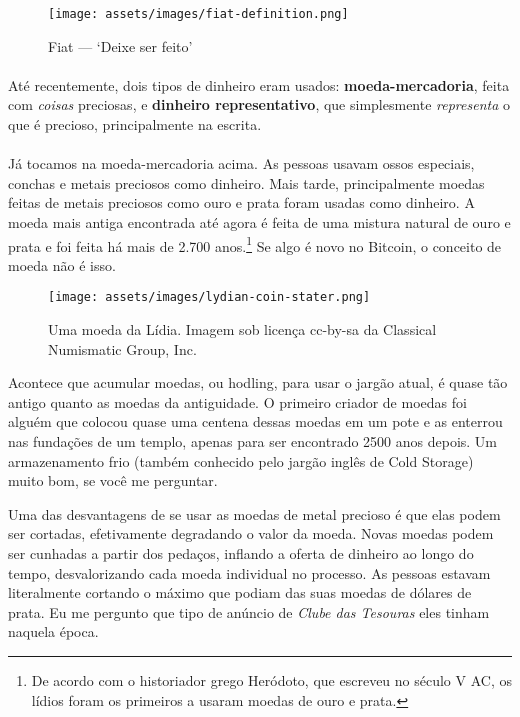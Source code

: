 \begin{figure}
  \centering
  \texttt{[image: assets/images/fiat-definition.png]}
  \caption{Fiat --- `Deixe ser feito'}
  \label{fig:fiat-definition}
\end{figure}

\paragraph{}
Até recentemente, dois tipos de dinheiro eram usados: \textbf{moeda-mercadoria}, feita com \textit{coisas} preciosas, e \textbf{dinheiro representativo}, que simplesmente \textit{representa} o que é precioso, principalmente na escrita.

\paragraph{}
Já tocamos na moeda-mercadoria acima. As pessoas usavam ossos especiais, conchas e metais preciosos como dinheiro. Mais tarde, principalmente moedas feitas de metais preciosos como ouro e prata foram usadas como dinheiro. A moeda mais antiga encontrada até agora é feita de uma mistura natural de ouro e prata e foi feita há mais de 2.700 anos.\footnote{De acordo com o historiador grego Heródoto, que escreveu no século V AC, os lídios foram os primeiros a usaram moedas de ouro e prata.\cite{coinage-origins}} Se algo é novo no Bitcoin, o conceito de moeda não é isso.

\begin{figure}
  \centering
  \texttt{[image: assets/images/lydian-coin-stater.png]}
  \caption{Uma moeda da Lídia. Imagem sob licença cc-by-sa da Classical Numismatic Group, Inc.}
  \label{fig:lydian-coin-stater}
\end{figure}

Acontece que acumular moedas, ou hodling, para usar o jargão atual, é quase tão antigo quanto as moedas da antiguidade. O primeiro criador de moedas foi alguém que colocou quase uma centena dessas moedas em um pote e as enterrou nas fundações de um templo, apenas para ser encontrado 2500 anos depois. Um armazenamento frio (também conhecido pelo jargão inglês de Cold Storage) muito bom, se você me perguntar.

Uma das desvantagens de se usar as moedas de metal precioso é que elas podem ser cortadas, efetivamente degradando o valor da moeda. Novas moedas podem ser cunhadas a partir dos pedaços, inflando a oferta de dinheiro ao longo do tempo, desvalorizando cada moeda individual no processo. As pessoas estavam literalmente cortando o máximo que podiam das suas moedas de dólares de prata. Eu me pergunto que tipo de anúncio de \textit{Clube das Tesouras} eles tinham naquela época.

